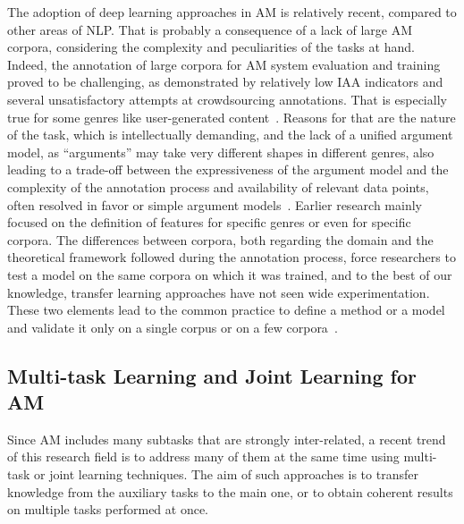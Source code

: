 \documentclass[journal]{IEEEtran}
\begin{document}
The adoption of deep learning approaches in AM is relatively recent, compared to other areas of NLP.
That is probably a consequence of a lack of large AM corpora, considering the complexity and peculiarities of the tasks at hand. Indeed, the annotation of large corpora for AM system evaluation and training proved to be challenging, as demonstrated by relatively low IAA indicators and several unsatisfactory attempts at crowdsourcing annotations. That is especially true for some genres like user-generated content~\cite{Habernal2017}. Reasons for that are the nature of the task, which is intellectually demanding, and the lack of a unified argument model, as ``arguments'' may take very different shapes in different genres, also leading to a trade-off between the expressiveness of the argument model and the complexity of the annotation process and availability of relevant data points, often resolved in favor or simple argument models~\cite{TOIT2016}. Earlier research mainly focused on the definition of features for specific genres or even for specific corpora.
The differences between corpora, both regarding the domain and the theoretical framework followed during the annotation process, force researchers to test a model on the same corpora on which it was trained, and to the best of our knowledge, transfer learning approaches have not seen wide experimentation. These two elements lead to the common practice to define a method or a model and validate it only on a single corpus or on a few corpora~\cite{TOIT2016}.


\subsection{Multi-task Learning and Joint Learning for AM}



Since AM includes many subtasks that are strongly inter-related, a recent trend of this research field is to address many of them at the same time using multi-task or joint learning techniques. The aim of such approaches is to transfer knowledge from the auxiliary tasks to the main one, or to obtain coherent results on multiple tasks performed at once.
\end{document}
